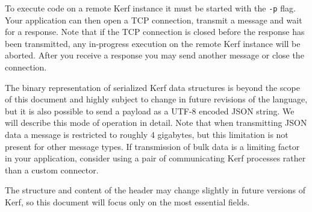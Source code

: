 \documentclass{article}
\begin{document}
To execute code on a remote Kerf instance it must be started with the \texttt{-p} flag. Your application can then open a TCP connection, transmit a message and wait for a response. Note that if the TCP connection is closed before the response has been transmitted, any in-progress execution on the remote Kerf instance will be aborted. After you receive a response you may send another message or close the connection. 

\vspace{0.5cm}

The binary representation of serialized Kerf data structures is beyond the scope of this document and highly subject to change in future revisions of the language, but it is also possible to send a payload as a UTF-8 encoded JSON string. We will describe this mode of operation in detail. Note that when transmitting JSON data a message is restricted to roughly 4 gigabytes, but this limitation is not present for other message types. If transmission of bulk data is a limiting factor in your application, consider using a pair of communicating Kerf processes rather than a custom connector.

\vspace{0.5cm}

The structure and content of the header may change slightly in future versions of Kerf, so this document will focus only on the most essential fields.
\end{document}
